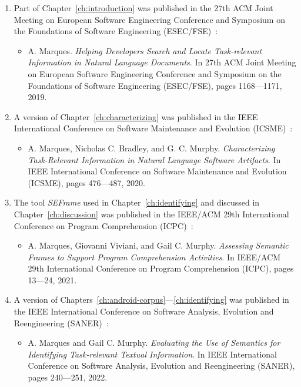 \begin{enumerate}
    \item Part of Chapter~\ref{ch:introduction} was published in the 27th ACM Joint Meeting on European Software Engineering Conference and Symposium on the Foundations of Software Engineering (ESEC/FSE)~\cite{marques2019}:


    \begin{itemize}
        \item A. Marques.
            \textit{Helping Developers Search and Locate Task-relevant Information in Natural Language Documents}. 
            In 27th ACM Joint Meeting on European Software Engineering Conference and Symposium on the Foundations of Software Engineering (ESEC/FSE),
            pages 1168---1171, 2019.
    \end{itemize}        


\item A version of Chapter~\ref{ch:characterizing} was published in the IEEE  International Conference on Software Maintenance and Evolution (ICSME)~\cite{marques2020}:


    \begin{itemize}
        \item A. Marques, Nicholas C. Bradley, and G. C. Murphy.
            \textit{Characterizing Task-Relevant Information in Natural Language Software Artifacts}. 
            In IEEE  International Conference on Software Maintenance and Evolution (ICSME),
            pages 476---487, 2020. 
    \end{itemize}

\item The tool \textit{SEFrame} used in Chapter~\ref{ch:identifying} and discussed in Chapter~\ref{ch:discussion} was published in the  IEEE/ACM 29th International Conference on Program Comprehension (ICPC)~\cite{marques2021}:


    \begin{itemize}
        \item A. Marques, Giovanni Viviani, and Gail C. Murphy.
            \textit{Assessing Semantic Frames to Support Program Comprehension Activities}. 
            In IEEE/ACM 29th International Conference on Program Comprehension (ICPC), 
            pages 13---24, 2021.
    \end{itemize}


\item A version of Chapters~\ref{ch:android-corpus}---\ref{ch:identifying} was published in the IEEE International Conference on Software Analysis, Evolution and Reengineering (SANER)~\cite{marques2022}: 


    \begin{itemize}
        \item A. Marques and Gail C. Murphy. 
            \textit{Evaluating the Use of Semantics for Identifying Task-relevant Textual Information}. 
            In IEEE International Conference on Software Analysis, Evolution and Reengineering (SANER),
            pages 240---251, 2022.
    \end{itemize}

\end{enumerate}



